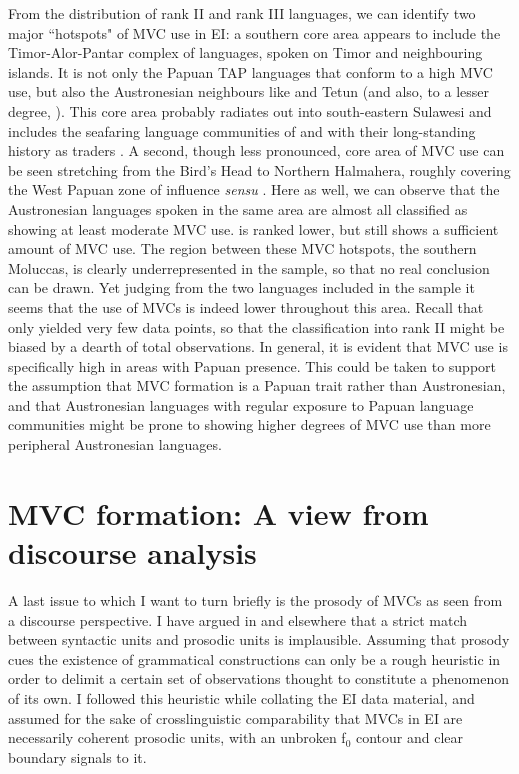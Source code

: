 \newpage 
From the distribution of rank II and rank III languages, we can identify two major ``hotspots" of MVC use in EI: a southern core area appears to include the Timor-Alor-Pantar complex of languages, spoken on Timor and neighbouring islands. It is not only the Papuan TAP languages that conform to a high MVC use, but also the Austronesian neighbours like  and Tetun (and also, to a lesser degree, ). This core area probably radiates out into south-eastern Sulawesi and includes the seafaring language communities of  and  with their long-standing history as traders \citep{donohue1999}. A second, though less pronounced, core area of MVC use can be seen stretching from the Bird's Head to Northern Halmahera, roughly covering the West Papuan zone of influence \textit{sensu} \citet{reesink2005west}. Here as well, we can observe that the Austronesian languages spoken in the same area are almost all classified as showing at least moderate MVC use.  is ranked lower, but still shows a sufficient amount of MVC use. The region between these MVC hotspots, the southern Moluccas, is clearly underrepresented in the sample, so that no real conclusion can be drawn. Yet judging from the two languages included in the sample it seems that the use of MVCs is indeed lower throughout this area. Recall that  only yielded very few data points, so that the classification into rank II might be biased by a dearth of total observations. In general, it is evident that MVC use is specifically high in areas with Papuan presence. This could be taken to support the assumption that MVC formation is a Papuan trait rather than Austronesian, and that Austronesian languages with regular exposure to Papuan language communities might be prone to showing higher degrees of MVC use than more peripheral Austronesian languages.

\section{MVC formation: A view from discourse analysis} \label{sec:discourse}

A last issue to which I want to turn briefly is the prosody of MVCs as seen from a discourse perspective. I have argued in  and elsewhere that a strict match between syntactic units and prosodic units is implausible. Assuming that prosody cues the existence of grammatical constructions can only be a rough heuristic in order to delimit a certain set of observations thought to constitute a phenomenon of its own. I followed this heuristic while collating the EI data material, and assumed for the sake of crosslinguistic comparability that MVCs in EI are necessarily coherent prosodic units, with an unbroken f$_0$ contour and clear boundary signals to it.

